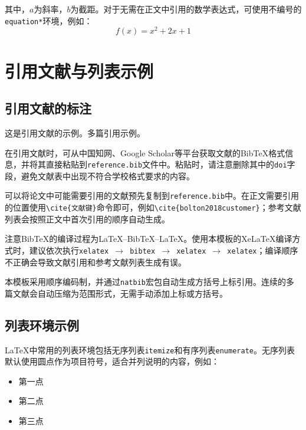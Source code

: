 \documentclass[12pt, a4paper, fontset=fandol]{ctexart}
\numberwithin{equation}{section}
\begin{document}
其中，$a$为斜率，$b$为截距。对于无需在正文中引用的数学表达式，可使用不编号的\texttt{equation*}环境，例如：
\begin{equation*}
    f(x) = x^2 + 2x + 1
\end{equation*}


\section{引用文献与列表示例}

\subsection{引用文献的标注}

这是引用文献的示例\cite{bolton2018customer}。多篇引用示例\cite{majchrzak2016designing,GLXB202112016,XiJinpingReport2022,LiQiangReport2024}。

在引用文献时，可从中国知网、Google Scholar等平台获取文献的Bib\TeX{}格式信息，并将其直接粘贴到\texttt{reference.bib}文件中。粘贴时，请注意删除其中的\texttt{doi}字段，避免文献表中出现不符合学校格式要求的内容。

可以将论文中可能需要引用的文献预先复制到\texttt{reference.bib}中。在正文需要引用的位置使用\verb|\cite{文献键}|命令即可，例如\verb|\cite{bolton2018customer}|；参考文献列表会按照正文中首次引用的顺序自动生成。

注意Bib\TeX{}的编译过程为LaTeX--Bib\TeX--LaTeX。使用本模板的XeLaTeX{}编译方式时，建议依次执行\texttt{xelatex $\rightarrow$ bibtex $\rightarrow$ xelatex $\rightarrow$ xelatex}；编译顺序不正确会导致文献引用和参考文献列表生成有误。

本模板采用顺序编码制，并通过\texttt{natbib}宏包自动生成方括号上标引用。连续的多篇文献会自动压缩为范围形式，无需手动添加上标或方括号。

\subsection{列表环境示例}

LaTeX{}中常用的列表环境包括无序列表\texttt{itemize}和有序列表\texttt{enumerate}。无序列表默认使用圆点作为项目符号，适合并列说明的内容，例如：

\begin{itemize}
  \item 第一点
  \item 第二点
  \item 第三点
\end{itemize}
\end{document}
